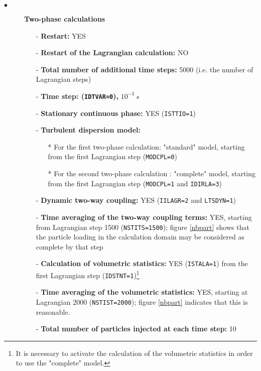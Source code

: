 \documentclass[a4paper,twoside,12pt]{article}
\begin{document}
\begin{description}
   \item[$\bullet$]\textbf{Two-phase calculations}
         \begin{itemize}
            \item[-] {\bf Restart:} YES
            \item[-] {\bf Restart of the Lagrangian calculation:} NO
            \item[-] {\bf Total number of additional time steps:} 5000
                  (i.e. the number of Lagrangian steps)
            \item[-] {\bf Time step: (\texttt{IDTVAR=0}),} $10^{-3}~s$
            \item[-] \textbf{Stationary continuous phase:} YES (\texttt{ISTTIO=1})
            \item[-] {\bf Turbulent dispersion model:}
                  \begin{itemize}
                     \item[*] For the first two-phase calculation: "standard" model, starting from the first Lagrangian step (\texttt{MODCPL=0})
                     \item[*] For the second two-phase calculation : "complete" model, starting from the first Lagrangian step (\texttt{MODCPL=1} and \texttt{IDIRLA=3})
                  \end{itemize}
            \item[-] {\bf Dynamic two-way coupling:} YES (\texttt{IILAGR=2} and \texttt{LTSDYN=1})
            \item[-] {\bf Time averaging of the two-way coupling terms:} YES, starting from Lagrangian step 1500 (\texttt{NSTITS=1500}); figure
                  \ref{nbpart} shows that the particle loading in the calculation domain may be considered as complete by that step
            \item[-] {\bf Calculation of volumetric statistics:} YES
                  (\texttt{ISTALA=1}) from the first Lagrangian step
                  (\texttt{IDSTNT=1})\footnote{It is necessary to activate the calculation of the volumetric statistics in order to use the "complete" model.}
            \item[-] {\bf Time averaging of the volumetric statistics:} YES, starting at Lagrangian 2000 (\texttt{NSTIST=2000}); figure \ref{nbpart} indicates that this is reasonable.
            \item[-] {\bf Total number of particles injected at each time step:} 10

         \end{itemize}

\end{description}
\end{document}
